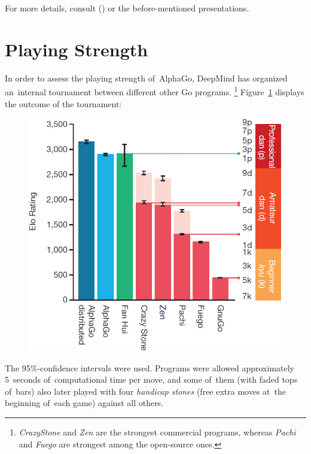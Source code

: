 For more details, consult (\cite{Silver2016mastering}) or the before-mentioned presentations.


\section{Playing Strength}
In order to assess the playing strength of~AlphaGo, DeepMind has organized an~internal tournament between different other Go programs.%
\footnote{\emph{CrazyStone} and \emph{Zen} are the strongest commercial programs, whereas \emph{Pachi} and \emph{Fuego} are strongest among the open-source ones.}
Figure~\ref{fig:Go-tournament} displays the outcome of the tournament:
\begin{figure}[H]
  \centering
  \includegraphics[width=.45\textwidth]{../img/results_of_tournament.png}
  \label{fig:Go-tournament}
\end{figure}
The 95\%-confidence intervals were used.
Programs were allowed approximately 5~seconds of~computational time per move, and some of~them (with faded tops of~bars) also later played with four \emph{handicap stones} (free extra moves at~the beginning of~each game) against all others.


